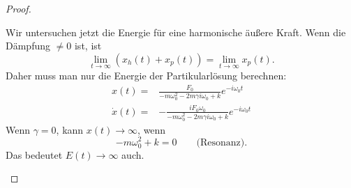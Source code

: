 \documentclass[prb,12pt]{revtex4-2}
\theoremstyle{definition}
\theoremstyle{definition}
\begin{document}
\begin{proof}
\begin{enumerate}
Wir untersuchen jetzt die Energie f\"{u}r eine harmonische äußere Kraft. Wenn die Dämpfung $\neq 0$ ist, ist
\[
\lim_{t \to \infty} \left( x_h(t)+x_p(t) \right) =\lim_{t \to \infty} x_p(t)
.\] 
Daher muss man nur die Energie der Partikularlösung berechnen:
\begin{align*}
	x(t)=& \frac{F_0}{-m\omega_0^2-2m\gamma i\omega_0+k}e^{-i\omega_0t}\\
	\dot{x}(t)=&-\frac{iF_0\omega_0}{-m\omega_0^2-2m\gamma i\omega_0+k}e^{-i\omega_0t}
\end{align*}
Wenn $\gamma = 0$, kann $x(t)\to\infty$, wenn
\[
	-m\omega_0^2+k=0\qquad\text{(Resonanz)}
.\]
Das bedeutet $E(t)\to \infty$ auch.
\end{enumerate}
\end{proof}
\end{document}
